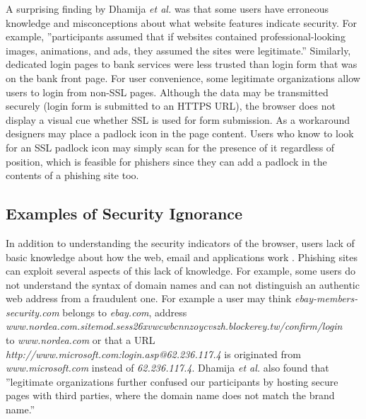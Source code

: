 \documentclass[english,gradu]{tktltiki}
\begin{document}
                  A surprising finding by Dhamija \emph{et al.} \cite{why_phishing_works_06} was that some users have erroneous knowledge and misconceptions about what website features indicate security. For example, ''participants assumed that if websites contained professional-looking images, animations, and ads, they assumed the sites were legitimate.'' Similarly, dedicated login pages to bank services were less trusted than login form that was on the bank front page. For user convenience, some legitimate organizations allow users to login from non-SSL pages. Although the data may be transmitted securely (login form is submitted to an HTTPS URL), the browser does not display a visual cue whether SSL is used for form submission. As a workaround designers may place a padlock icon in the page content. Users who know to look for an SSL padlock icon may simply scan for the presence of it regardless of position, which is feasible for phishers since they can add a padlock in the contents of a phishing site too.




\subsection{Examples of Security Ignorance} %
\label{sub:examples_of_security_ignorance}

              In addition to understanding the security indicators of the browser, users lack of basic knowledge about how the web, email and applications work \cite{why_phishing_works_06}. Phishing sites can exploit several aspects of this lack of knowledge. For example, some users do not understand the syntax of domain names and can not distinguish an authentic web address from a fraudulent one. For example a user may think
          \emph{ebay-members-security.com} belongs to \emph{ebay.com}, address \\
          \emph{www.nordea.com.sitemod.sess26xvwcwbcnnzoycvszh.blockerey.tw/confirm/login} \\
          to \emph{www.nordea.com} or that a URL \emph{http://www.microsoft.com:login.asp@62.236.117.4}
          is originated from \emph{www.microsoft.com} instead of \emph{62.236.117.4}.
          Dhamija \emph{et al.} \cite{why_phishing_works_06} also found that ''legitimate organizations further confused our participants by hosting secure pages with third parties, where the domain name does not match the brand name.''
\end{document}
